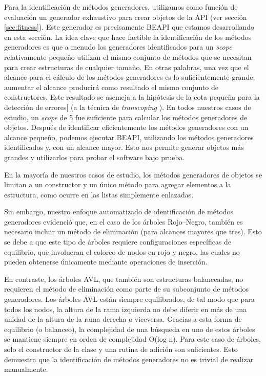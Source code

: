Para la identificación de métodos generadores, utilizamos como función de evaluación un generador exhaustivo para crear objetos de la API (ver sección \ref{sec:fitness}). 
Este generador es precisamente BEAPI que estamos desarrollando en esta sección. 
La idea clave que hace factible la identificación de los métodos generadores es que a menudo los generadores identificados para un \emph{scope} relativamente pequeño 
utilizan el mismo conjunto de métodos que se necesitan para crear estructuras de cualquier tamaño.
En otras palabras, una vez que el alcance para el cálculo de los métodos generadores es lo suficientemente grande, aumentar el alcance producirá como resultado el mismo conjunto de constructores. 
Este resultado se asemeja a la hipótesis de la cota pequeña para la detección de errores[\cite{Andoni02} (a la técnica de \emph{transcoping} \cite{Rosner13}).
En todos nuestros casos de estudio, un \emph{scope} de 5 fue suficiente para calcular los métodos generadores de objetos. 
Después de identificar eficientemente los métodos generadores con un alcance pequeño, podemos ejecutar \textsf{BEAPI}, utilizando los métodos generadores identificados y,
con un alcance mayor. Esto nos permite generar objetos más grandes y utilizarlos para probar el software bajo prueba.

En la mayoría de nuestros casos de estudio, los métodos generadores de objetos se limitan a un 
constructor y un único método para agregar elementos a la estructura, como ocurre en las listas 
simplemente enlazadas.  

Sin embargo, nuestro enfoque automatizado de identificación de métodos generadores evidenció que, 
en el caso de los árboles Rojo–Negro, también es necesario incluir un método de eliminación 
(para alcances mayores que tres).  
Esto se debe a que este tipo de árboles requiere configuraciones específicas de equilibrio, 
que involucran el coloreo de nodos en rojo y negro, las cuales no pueden obtenerse únicamente 
mediante operaciones de inserción.

En contraste, los árboles AVL,
que también son estructuras balanceadas, no requieren el método de eliminación como parte de su subconjunto de métodos generadores.
Los árboles AVL están siempre equilibrados, 
de tal modo que para todos los nodos, la altura de la rama izquierda no debe diferir en más de una unidad de la altura de la rama derecha o viceversa. 
Gracias a esta forma de equilibrio (o balanceo), la complejidad de una búsqueda en uno de estos árboles se mantiene siempre en orden de complejidad O(log n). 
Para este caso de árboles, solo el constructor de la clase y una rutina de adición son suficientes. 
Esto demuestra que la identificación de métodos generadores no es trivial de realizar manualmente.

